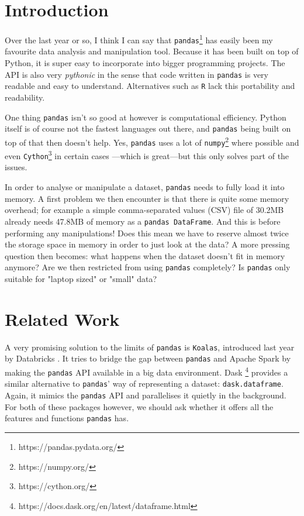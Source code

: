 \section{Introduction}


Over the last year or so, I think I can say that \texttt{pandas}\footnote{https://pandas.pydata.org/} has easily been my favourite data analysis and manipulation tool. Because it has been built on top of Python, it is super easy to incorporate into bigger programming projects. The API is also very \textit{pythonic} in the sense that code written in \texttt{pandas} is very readable and easy to understand. Alternatives such as \texttt{R} lack this portability and readability.

One thing \texttt{pandas} isn't so good at however is computational efficiency. Python itself is of course not the fastest languages out there, and \texttt{pandas} being built on top of that then doesn't help. Yes, \texttt{pandas} uses a lot of \texttt{numpy}\footnote{https://numpy.org/} where possible and even \texttt{Cython}\footnote{https://cython.org/} in certain cases \cite[p.~4]{mckinney2012python}---which is great---but this only solves part of the issues.

In order to analyse or manipulate a dataset, \texttt{pandas} needs to fully load it into memory. A first problem we then encounter is that there is quite some memory overhead; for example a simple comma-separated values (CSV) file of 30.2MB already needs 47.8MB of memory as a \texttt{pandas DataFrame}. And this is before performing any manipulations! Does this mean we have to reserve almost twice the storage space in memory in order to just look at the data? A more pressing question then becomes: what happens when the dataset doesn't fit in memory anymore? Are we then restricted from using \texttt{pandas} completely? Is \texttt{pandas} only suitable for "laptop sized" or "small" data?

\section{Related Work}


A very promising solution to the limits of \texttt{pandas} is \texttt{Koalas}, introduced last year by Databricks \cite{koalas_announced}. It tries to bridge the gap between \texttt{pandas} and Apache Spark by making the \texttt{pandas} API available in a big data environment. Dask \footnote{https://docs.dask.org/en/latest/dataframe.html} provides a similar alternative to \texttt{pandas}' way of representing a dataset: \texttt{dask.dataframe}. Again, it mimics the \texttt{pandas} API and parallelises it quietly in the background. For both of these packages however, we should ask whether it offers all the features and functions \texttt{pandas} has.


